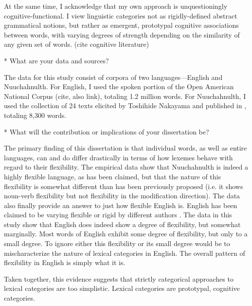   At the same time, I acknowledge that my own approach is unquestioningly cognitive-functional. I view linguistic categories not as rigidly-defined abstract grammatical notions, but rather as emergent, prototypal cognitive associations between words, with varying degrees of strength depending on the similarity of any given set of words. (cite cognitive literature)

* What are your data and sources?

  The data for this study consist of corpora of two languages---English and Nuuchahnulth. For English, I used the spoken portion of the Open American National Corpus (cite, also link), totaling 1.2 million words. For Nuuchahnulth, I used the collection of 24 texts elicited by Toshihide Nakayama and published in , totaling 8,300 words.

* What will the contribution or implications of your dissertation be?

  The primary finding of this dissertation is that individual words, as well as entire languages, can and do differ drastically in terms of how lexemes behave with regard to their flexibility. The empirical data show that Nuuchahnulth is indeed a highly flexible language, as has been claimed, but that the nature of this flexibility is somewhat different than has been previously proposed (i.e. it shows noun-verb flexibility but not flexibility in the modification direction). The data also finally provide an answer to just how flexible English is. English has been claimed to be varying flexible or rigid by different authors . The data in this study show that English does indeed show a degree of flexibility, but somewhat marginally. Most words of English exhibit some degree of flexibility, but only to a small degree. To ignore either this flexibility or its small degree would be to mischaracterize the nature of lexical categories in English. The overall pattern of flexibility in English is simply what it is.

  Taken together, this evidence suggests that strictly categorical approaches to lexical categories are too simplistic. Lexical categories are prototypal, cognitive categories.

